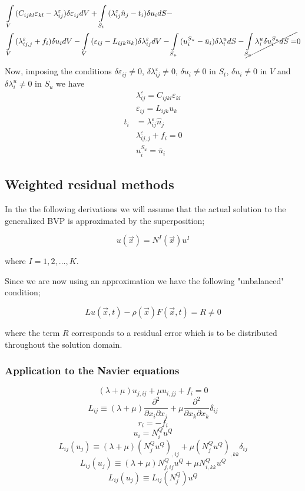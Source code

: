 \begin{align*}
&\int\limits_V {({C_{ijkl}}{\varepsilon _{kl}} - \lambda _{ij}^\varepsilon )\delta {\varepsilon _{ij}}dV
+ \int\limits_{{S_t}} {(\lambda _{ij}^\varepsilon {{\hat n}_j} - {t_i})\delta {u_i}dS}  - }\\
&\int\limits_V {(\lambda _{ij,j}^\varepsilon  + {f_i})\delta {u_i}dV}
- \int\limits_V {({\varepsilon _{ij}} - {L_{ijk}}{u_k})\delta \lambda _{ij}^\varepsilon dV}
- \int\limits_{{S_u}} {(u_i^{{S_u}} - {{\bar u}_i})\delta \lambda _i^udS}  - \cancel{\int\limits_{{S_u}} {\lambda _i^u\delta u_i^{{S_u}}dS} = } 0
\end{align*}


Now, imposing the conditions $\delta {\varepsilon _{ij}} \neq 0$, $\delta \lambda _{ij}^\varepsilon  \neq 0$, $\delta {u_i} \neq 0$ in $S_t$, $\delta {u_i} \neq 0$ in $V$ and $\delta \lambda _i^u \neq 0$ in $S_u$ we have
%
\begin{align}
&\lambda _{ij}^\varepsilon  = C_{ijkl} \varepsilon_{kl}\\
&\varepsilon_{ij} = {L_{ijk}}{u_k}\\
t_i &= \lambda_{ij}^\varepsilon \hat{n}_j\\
&\lambda _{ij,j}^\varepsilon  + {f_i} = 0\\
&u_i^{S_u} = \bar{u}_i
\end{align}

\subsection{Weighted residual methods}
In the the following derivations we will assume that the actual solution to the generalized BVP is approximated by the superposition;

\[u(\vec x) = {N^I}(\vec x){u^I}\]

where $I=1,2,...,K$.

Since we are now using an approximation we have the following "unbalanced" condition;

\[Lu(\vec x,t) - \rho (\vec x)F(\vec x,t) = R \ne 0\]

where the term $R$ corresponds to a residual error which is to be distributed throughout the solution domain.



\subsubsection*{Application to the Navier equations}

\[(\lambda  + \mu ){u_{j,ij}} + \mu {u_{i,jj}} + {f_i} = 0\]
\[{L_{ij}} \equiv (\lambda  + \mu )\frac{{{\partial ^2}}}{{\partial {x_i}\partial {x_j}}} + \mu \frac{{{\partial ^2}}}{{\partial {x_k}\partial {x_k}}}{\delta _{ij}}\]
\[{r_i} =  - {f_i}\]
\[{u_i} = N_i^Q{u^Q}\]
\[{L_{ij}}({u_j}) \equiv (\lambda  + \mu ){(N_j^Q{u^Q})_{,ij}} + \mu {(N_j^Q{u^Q})_{,kk}}{\delta _{ij}}\]
\[{L_{ij}}({u_j}) \equiv (\lambda  + \mu )N_{j,ij}^Q{u^Q} + \mu N_{i,kk}^Q{u^Q}\]
\[{L_{ij}}({u_j}) \equiv {L_{ij}}(N_j^Q){u^Q}\]

